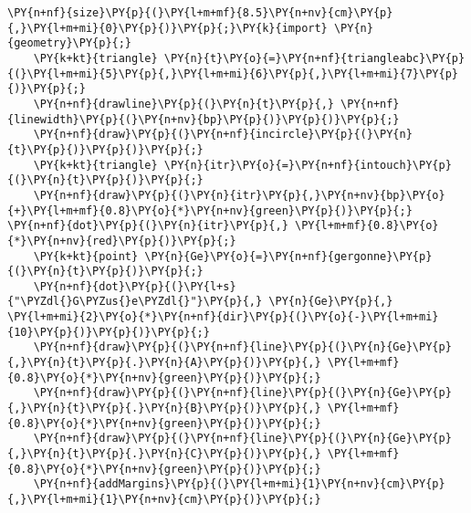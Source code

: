 \begin{Verbatim}[commandchars=\\\{\}]
    \PY{n+nf}{size}\PY{p}{(}\PY{l+m+mf}{8.5}\PY{n+nv}{cm}\PY{p}{,}\PY{l+m+mi}{0}\PY{p}{)}\PY{p}{;}\PY{k}{import} \PY{n}{geometry}\PY{p}{;}
    \PY{k+kt}{triangle} \PY{n}{t}\PY{o}{=}\PY{n+nf}{triangleabc}\PY{p}{(}\PY{l+m+mi}{5}\PY{p}{,}\PY{l+m+mi}{6}\PY{p}{,}\PY{l+m+mi}{7}\PY{p}{)}\PY{p}{;}
    \PY{n+nf}{drawline}\PY{p}{(}\PY{n}{t}\PY{p}{,} \PY{n+nf}{linewidth}\PY{p}{(}\PY{n+nv}{bp}\PY{p}{)}\PY{p}{)}\PY{p}{;}
    \PY{n+nf}{draw}\PY{p}{(}\PY{n+nf}{incircle}\PY{p}{(}\PY{n}{t}\PY{p}{)}\PY{p}{)}\PY{p}{;}
    \PY{k+kt}{triangle} \PY{n}{itr}\PY{o}{=}\PY{n+nf}{intouch}\PY{p}{(}\PY{n}{t}\PY{p}{)}\PY{p}{;}
    \PY{n+nf}{draw}\PY{p}{(}\PY{n}{itr}\PY{p}{,}\PY{n+nv}{bp}\PY{o}{+}\PY{l+m+mf}{0.8}\PY{o}{*}\PY{n+nv}{green}\PY{p}{)}\PY{p}{;} \PY{n+nf}{dot}\PY{p}{(}\PY{n}{itr}\PY{p}{,} \PY{l+m+mf}{0.8}\PY{o}{*}\PY{n+nv}{red}\PY{p}{)}\PY{p}{;}
    \PY{k+kt}{point} \PY{n}{Ge}\PY{o}{=}\PY{n+nf}{gergonne}\PY{p}{(}\PY{n}{t}\PY{p}{)}\PY{p}{;}
    \PY{n+nf}{dot}\PY{p}{(}\PY{l+s}{"\PYZdl{}G\PYZus{}e\PYZdl{}"}\PY{p}{,} \PY{n}{Ge}\PY{p}{,} \PY{l+m+mi}{2}\PY{o}{*}\PY{n+nf}{dir}\PY{p}{(}\PY{o}{-}\PY{l+m+mi}{10}\PY{p}{)}\PY{p}{)}\PY{p}{;}
    \PY{n+nf}{draw}\PY{p}{(}\PY{n+nf}{line}\PY{p}{(}\PY{n}{Ge}\PY{p}{,}\PY{n}{t}\PY{p}{.}\PY{n}{A}\PY{p}{)}\PY{p}{,} \PY{l+m+mf}{0.8}\PY{o}{*}\PY{n+nv}{green}\PY{p}{)}\PY{p}{;}
    \PY{n+nf}{draw}\PY{p}{(}\PY{n+nf}{line}\PY{p}{(}\PY{n}{Ge}\PY{p}{,}\PY{n}{t}\PY{p}{.}\PY{n}{B}\PY{p}{)}\PY{p}{,} \PY{l+m+mf}{0.8}\PY{o}{*}\PY{n+nv}{green}\PY{p}{)}\PY{p}{;}
    \PY{n+nf}{draw}\PY{p}{(}\PY{n+nf}{line}\PY{p}{(}\PY{n}{Ge}\PY{p}{,}\PY{n}{t}\PY{p}{.}\PY{n}{C}\PY{p}{)}\PY{p}{,} \PY{l+m+mf}{0.8}\PY{o}{*}\PY{n+nv}{green}\PY{p}{)}\PY{p}{;}
    \PY{n+nf}{addMargins}\PY{p}{(}\PY{l+m+mi}{1}\PY{n+nv}{cm}\PY{p}{,}\PY{l+m+mi}{1}\PY{n+nv}{cm}\PY{p}{)}\PY{p}{;}
\end{Verbatim}

